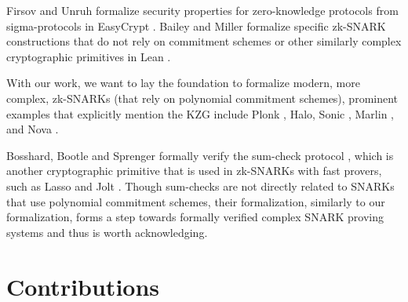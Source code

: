 Firsov and Unruh formalize security properties for zero-knowledge protocols from sigma-protocols in EasyCrypt \parencite{zk_easycrypt}.
Bailey and Miller formalize specific zk-SNARK constructions that do not rely on commitment schemes or other similarly complex cryptographic primitives in Lean \parencite{Lean_groth16}. 

With our work, we want to lay the foundation to formalize modern, more complex, zk-SNARKs (that rely on polynomial commitment schemes), prominent examples that explicitly mention the KZG include Plonk \parencite{plonk}, Halo\parencite{halo}, Sonic \parencite{sonic}, Marlin \parencite{marlin}, and Nova \parencite{nova}.

Bosshard, Bootle and Sprenger formally verify the sum-check protocol \parencite{sumcheck_Isabelle}, which is another cryptographic primitive that is used in zk-SNARKs with fast provers, such as Lasso and Jolt \parencite{Lasso, jolt}. Though sum-checks are not directly related to SNARKs that use polynomial commitment schemes, their formalization, similarly to our formalization, forms a step towards formally verified complex SNARK proving systems and thus is worth acknowledging.

\section*{Contributions}

